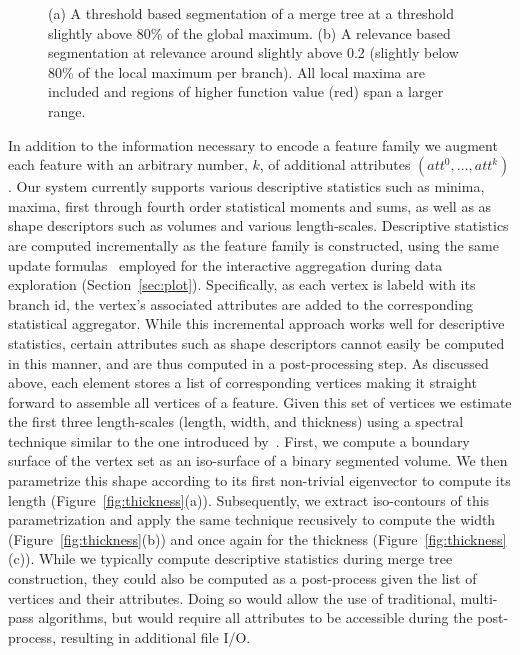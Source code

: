 \begin{figure}[htbp]
  \centering
  \caption{(a) A threshold based segmentation of a merge tree at a threshold
    slightly above 80\% of the global maximum. (b) A relevance based segmentation at
    relevance around slightly above 0.2 (slightly below 80\% of the local
    maximum per branch). All local maxima are included and regions of
    higher function value (red) span a larger range. }
\end{figure}

In addition to the information necessary to encode a feature family we
augment each feature with an arbitrary number, $k$, of additional
attributes $(att^0,\ldots, att^k)$.  Our system currently supports
various descriptive statistics such as minima, maxima, first through
fourth order statistical moments and sums, as well as as shape
descriptors such as volumes and various length-scales. Descriptive
statistics are computed incrementally as the feature family is
constructed, using the same update
formulas~\cite{Bennett:Cluster09,pebay:08} employed for the
interactive aggregation during data exploration
(Section~\ref{sec:plot}). Specifically, as each vertex is labeld with
its branch id, the vertex's associated attributes are added to the
corresponding statistical aggregator.  While this incremental approach
works well for descriptive statistics, certain attributes such as
shape descriptors cannot easily be computed in this manner, and are
thus computed in a post-processing step.  As discussed above, each
element stores a list of corresponding vertices making it straight
forward to assemble all vertices of a feature. Given this set of
vertices we estimate the first three length-scales (length, width, and
thickness) using a spectral technique similar to the one introduced
by~\cite{Reuter09}. First, we compute a boundary surface of the vertex
set as an iso-surface of a binary segmented volume. We then
parametrize this shape according to its first non-trivial eigenvector
to compute its length (Figure~\ref{fig:thickness}(a)). Subsequently,
we extract iso-contours of this parametrization and apply the same
technique recusively to compute the width
(Figure~\ref{fig:thickness}(b)) and once again for the thickness
(Figure~\ref{fig:thickness}(c)). While we typically compute
descriptive statistics during merge tree construction, they could also
be computed as a post-process given the list of vertices and their
attributes. Doing so would allow the use of traditional, multi-pass
algorithms, but would require all attributes to be accessible during
the post-process, resulting in additional file I/O.


